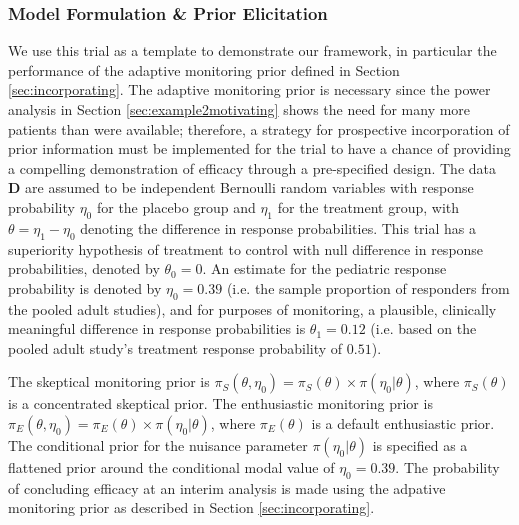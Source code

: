 \documentclass[12pt]{article}
\begin{document}
\subsubsection{Model Formulation \& Prior Elicitation}\label{sec:example2model}
We use this trial as a template to demonstrate our framework, in particular the performance of the adaptive monitoring prior defined in Section \ref{sec:incorporating}. The adaptive monitoring prior is necessary since the power analysis in Section \ref{sec:example2motivating} shows the need for many more patients than were available; therefore, a strategy for prospective incorporation of prior information must be implemented for the trial to have a chance of providing a compelling demonstration of efficacy through a pre-specified design.
%
The data $\mathbf{D}$ are assumed to be independent Bernoulli random variables with response probability $\eta_0$ for the placebo group and $\eta_1$ for the treatment group, with $\theta=\eta_1-\eta_0$ denoting the difference in response probabilities. 
%
This trial has a superiority hypothesis of treatment to control with null difference in response probabilities, denoted by $\theta_0=0$.
%
An estimate for the pediatric response probability is denoted by $\eta_0=0.39$ (i.e. the sample proportion of responders from the pooled adult studies), and for purposes of monitoring, a plausible, clinically meaningful difference in response probabilities is $\theta_1=0.12$ (i.e. based on the pooled adult study's treatment response probability of $0.51$).%
%

The skeptical monitoring prior is $\pi_S(\theta,\eta_0)=\pi_S(\theta)\times\pi(\eta_0|\theta)$, where $\pi_S(\theta)$ is a concentrated skeptical prior.
%
The enthusiastic monitoring prior is $\pi_E(\theta,\eta_0)=\pi_E(\theta)\times\pi(\eta_0|\theta)$, where $\pi_E(\theta)$ is a default enthusiastic prior. 
%
The conditional prior for the nuisance parameter $\pi(\eta_0|\theta)$ is specified as a flattened prior around the conditional modal value of $\eta_0=0.39$.
%
The probability of concluding efficacy at an interim analysis is made using the adpative monitoring prior as described in Section \ref{sec:incorporating}.
%
%
%
\end{document}
